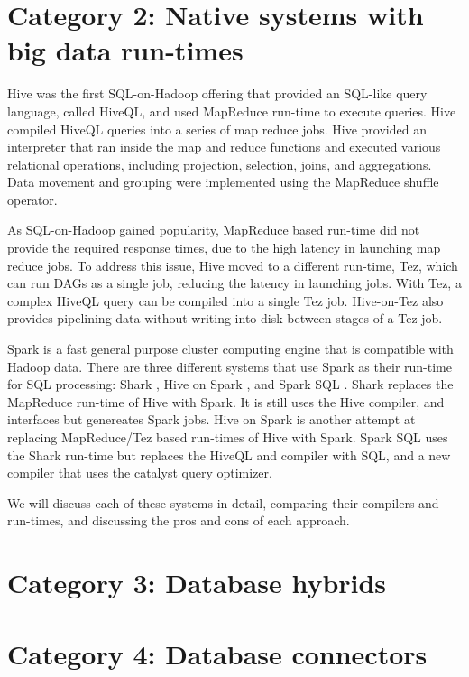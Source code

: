 \documentclass{vldb}
\begin{document}
\section{Category 2: Native systems with big data run-times}

Hive \cite{hive} was the first SQL-on-Hadoop offering that provided an SQL-like query language, called HiveQL, and used MapReduce run-time to execute queries. Hive compiled HiveQL queries into a series of map reduce jobs. Hive provided an interpreter that ran inside the map and reduce functions and executed various relational operations, including projection, selection, joins, and aggregations. Data movement and grouping were implemented using the MapReduce shuffle operator. 

As SQL-on-Hadoop gained popularity, MapReduce based run-time did not provide the required response times, due to the high latency in launching map reduce jobs. To address this issue, Hive moved to a different run-time, Tez, which can run DAGs as a single job, reducing the latency in launching jobs. With Tez, a complex HiveQL query can be compiled into a single Tez job. Hive-on-Tez also provides pipelining data without writing into disk between stages of a Tez job. 

Spark is a fast general purpose cluster computing engine that is compatible with Hadoop data.  There are three different systems that use Spark as their run-time for SQL processing: Shark \cite{shark}, Hive on Spark \cite{hiveSpark}, and Spark SQL \cite{sparkSQL}. Shark replaces the MapReduce run-time of Hive \cite{hive} with Spark. It is still uses the Hive compiler, and interfaces but genereates Spark jobs. Hive on Spark is another attempt at replacing MapReduce/Tez based run-times of Hive with Spark. Spark SQL uses the Shark \cite{shark} run-time but replaces the HiveQL and compiler with SQL, and a new compiler that uses the catalyst query optimizer. 

We will discuss each of these systems in detail, comparing their compilers and run-times, and discussing the pros and cons of each approach.

\section{Category 3: Database hybrids}

\section{Category 4: Database connectors}
\end{document}
